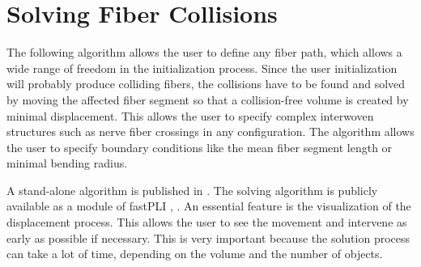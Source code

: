 \section{Solving Fiber Collisions}
\label{sec:Solver}
%
The following algorithm allows the user to define any fiber path, which allows a wide range of freedom in the initialization process.
Since the user initialization will probably produce colliding fibers, the collisions have to be found and solved by moving the affected fiber segment so that a collision-free volume is created by minimal displacement.
This allows the user to specify complex interwoven structures such as nerve fiber crossings in any configuration.
The algorithm allows the user to specify boundary conditions like the mean fiber segment length or minimal bending radius.
\par
% 
A stand-alone algorithm is published in \cite{Matuschke2019}.
The solving algorithm is publicly available as a module of \ac{fastPLI} \cite{Matuschke2021}, .
An essential feature is the visualization of the displacement process.
This allows the user to see the movement and intervene as early as possible if necessary.
This is very important because the solution process can take a lot of time, depending on the volume and the number of objects.
%
%
% 
